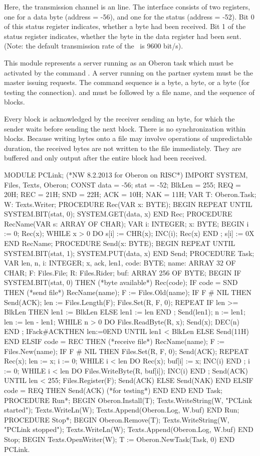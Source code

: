 Here, the transmission channel is an  line. The interface consists of two registers, one for a data byte (address = -56), and one for the status (address = -52). Bit 0 of this status register indicates, whether a byte had been received. Bit 1 of the status register indicates, whether the byte in the data register had been sent. (Note: the default transmission rate of the \RISC\ is 9600 bit/s).

This module represents a server running as an Oberon task which must be activated by the command . A server running on the partner system must be the master issuing requests. The command sequence is a  byte, a  byte, or a  byte (for testing the connection).  and  must be followed by a file name, and the sequence of blocks.

Every block is acknowledged by the receiver sending an  byte, for which the sender waits before sending the next block. There is no synchronization within blocks. Because writing bytes onto a file may involve operations of unpredictable duration, the received bytes are not written to the file immediately. They are buffered and only output after the entire block had been received.
\begintt

MODULE PCLink; (*NW 8.2.2013 for Oberon on RISC*) IMPORT SYSTEM, Files, Texts, Oberon;
CONST data = -56; stat = -52;
BlkLen = 255;
REQ = 20H; REC = 21H; SND = 22H; ACK = 10H; NAK = 11H;
VAR T: Oberon.Task; W: Texts.Writer; PROCEDURE Rec(VAR x: BYTE); BEGIN
REPEAT UNTIL SYSTEM.BIT(stat, 0);
SYSTEM.GET(data, x) END Rec;
PROCEDURE RecName(VAR s: ARRAY OF CHAR); VAR i: INTEGER; x: BYTE;
BEGIN i := 0; Rec(x);
WHILE x > 0 DO s[i] := CHR(x); INC(i); Rec(x) END ; s[i] := 0X
END RecName;
PROCEDURE Send(x: BYTE); BEGIN
REPEAT UNTIL SYSTEM.BIT(stat, 1);
SYSTEM.PUT(data, x) END Send;
PROCEDURE Task;
VAR len, n, i: INTEGER;
x, ack, len1, code: BYTE; name: ARRAY 32 OF CHAR; F: Files.File; R: Files.Rider; buf: ARRAY 256 OF BYTE;
BEGIN
IF SYSTEM.BIT(stat, 0) THEN (*byte available*)
Rec(code);
IF code = SND THEN (*send file*)
RecName(name); F := Files.Old(name); IF F # NIL THEN
Send(ACK); len := Files.Length(F); Files.Set(R, F, 0); REPEAT
IF len >= BlkLen THEN len1 := BlkLen ELSE len1 := len END ; Send(len1); n := len1; len := len - len1;
WHILE n > 0 DO Files.ReadByte(R, x); Send(x); DEC(n) END ; IFack#ACKTHEN len:=0END
UNTIL len1 < BlkLen ELSE Send(11H)
END
ELSIF code = REC THEN (*receive file*) RecName(name); F := Files.New(name); IF F # NIL THEN
Files.Set(R, F, 0); Send(ACK); REPEAT Rec(x); len := x; i := 0;
WHILE i < len DO Rec(x); buf[i] := x; INC(i) END ;
i := 0;
WHILE i < len DO Files.WriteByte(R, buf[i]); INC(i) END ; Send(ACK)
UNTIL len < 255;
Files.Register(F); Send(ACK) ELSE Send(NAK)
END
ELSIF code = REQ THEN Send(ACK) (*for testing*)
END END
END Task;
PROCEDURE Run*;
BEGIN Oberon.Install(T); Texts.WriteString(W, "PCLink started");
Texts.WriteLn(W); Texts.Append(Oberon.Log, W.buf) END Run;
PROCEDURE Stop*;
BEGIN Oberon.Remove(T); Texts.WriteString(W, "PCLink stopped"); Texts.WriteLn(W); Texts.Append(Oberon.Log, W.buf)
END Stop;
BEGIN Texts.OpenWriter(W); T := Oberon.NewTask(Task, 0) END PCLink.
\endtt

